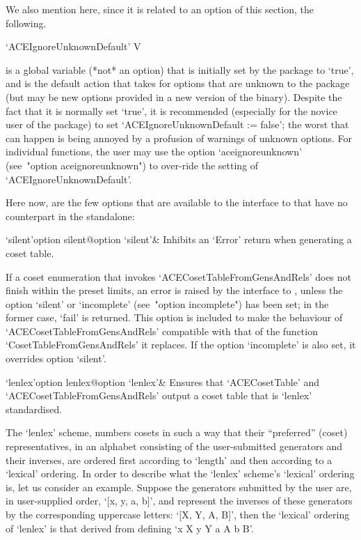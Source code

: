 We also mention here, since  it  is  related  to  an  option  of  this
section, the following.

\>`ACEIgnoreUnknownDefault' V

is a global variable (*not* an option) that is initially  set  by  the
{\ACE} package to `true', and is the default action that {\ACE}  takes
for options that are unknown to the {\ACE} package  (but  may  be  new
options provided in a new version of the {\ACE} binary).  Despite  the
fact that it is normally set `true', it is recommended (especially for
the novice user of the {\ACE} package) to set `ACEIgnoreUnknownDefault
:= false'; the worst that can happen is being annoyed by  a  profusion
of warnings of unknown options. For individual functions, the user may
use the option `aceignoreunknown' (see~"option  aceignoreunknown")  to
over-ride the setting of `ACEIgnoreUnknownDefault'.

Here now, are the  few  options  that  are  available  to  the  {\GAP}
interface to {\ACE} that have no counterpart in the {\ACE} standalone:

\beginitems

\>`silent'{option silent}@{option `silent'}& 
Inhibits an `Error' return when generating a coset table.

If a coset  enumeration  that  invokes  `ACECosetTableFromGensAndRels'
does not finish within the preset limits, an error is  raised  by  the
interface to  {\GAP},  unless  the  option  `silent'  or  `incomplete'
(see~"option incomplete") has been set; in the former case, `fail'  is
returned.  This  option  is  included  to  make   the   behaviour   of
`ACECosetTableFromGensAndRels' compatible with that  of  the  function
`CosetTableFromGensAndRels' it replaces. If the option `incomplete' is
also set, it overrides option `silent'.

\>`lenlex'{option lenlex}@{option `lenlex'}& 
Ensures that `ACECosetTable' and `ACECosetTableFromGensAndRels' output
a coset table that is `lenlex' standardised.

The  `lenlex'  scheme,  numbers  cosets  in  such  a  way  that  their
``preferred'' (coset) representatives, in an  alphabet  consisting  of
the user-submitted generators and their inverses,  are  ordered  first
according to `length' and then according to a `lexical'  ordering.  In
order to describe what the `lenlex' scheme's  `lexical'  ordering  is,
let us consider an example. Suppose the generators  submitted  by  the
user are, in user-supplied order, `[x, y, a, b]',  and  represent  the
inverses of these generators by the corresponding  uppercase  letters:
`[X, Y, A, B]', then  the  `lexical'  ordering  of  `lenlex'  is  that
derived from defining `x \< X \< y \< Y \< a \< A \< b \< B'.

